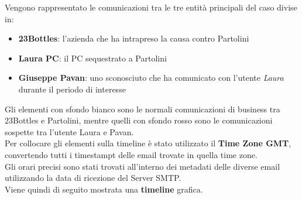 Vengono rappresentato le comunicazioni tra le tre entità principali del caso divise in:
\begin{itemize}
    \item \textbf{23Bottles}: l'azienda che ha intrapreso la causa contro Partolini
    \item \textbf{Laura PC}: il PC sequestrato a Partolini
    \item \textbf{Giuseppe Pavan}: uno sconosciuto che ha comunicato con l'utente \textit{Laura} durante il periodo di interesse
\end{itemize}
Gli elementi con sfondo bianco sono le normali comunicazioni  di business tra 23Bottles e Partolini, mentre quelli con sfondo rosso sono  le comunicazioni sospette tra l'utente Laura e Pavan.\vspace{14pt}\\
Per collocare gli elementi sulla timeline è stato utilizzato il \textbf{Time Zone GMT}, convertendo tutti i timestampt delle email trovate in quella time zone.\\
Gli orari precisi sono stati trovati all'interno dei metadati delle diverse email utilizzando la data di ricezione del Server SMTP.\vspace{14pt}\\
Viene quindi di seguito mostrata una \textbf{timeline} grafica.